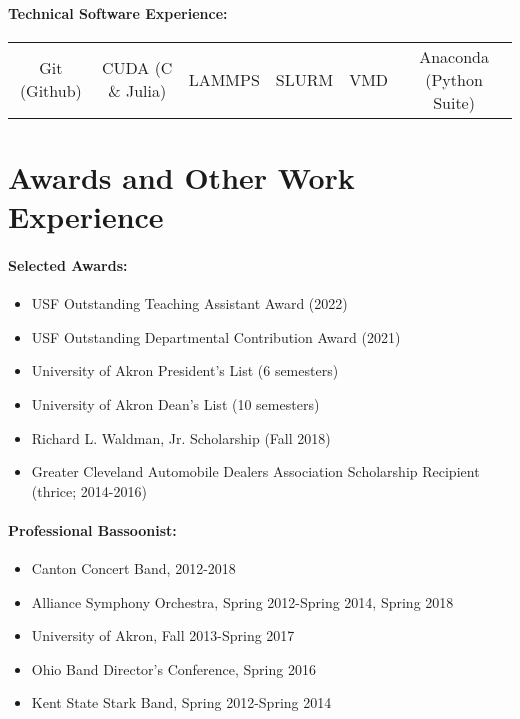 \documentclass{my_cv}
\begin{document}
\paragraph{Technical Software Experience:}
\begin{center}
\begin{tabular}{c|c|c|c|c|c}
   Git (Github) & CUDA (C \& Julia) & LAMMPS & SLURM & VMD & Anaconda (Python Suite) \\
\end{tabular}
\end{center}

\section{Awards and Other Work Experience}

\paragraph{Selected Awards:}
\begin{itemize}
    \item USF Outstanding Teaching Assistant Award (2022)
    \item USF Outstanding Departmental Contribution Award (2021)
    \item University of Akron President's List (6 semesters)
    \item University of Akron Dean's List (10 semesters)
    \item Richard L. Waldman, Jr. Scholarship (Fall 2018)
    \item Greater Cleveland Automobile Dealers Association Scholarship Recipient (thrice; 2014-2016)
\end{itemize}

\paragraph{Professional Bassoonist:}
\begin{itemize}
	\item Canton Concert Band, 2012-2018
	\item Alliance Symphony Orchestra, Spring 2012-Spring 2014, Spring 2018
    \item University of Akron, Fall 2013-Spring 2017
	\item Ohio Band Director’s Conference, Spring 2016
	\item Kent State Stark Band, Spring 2012-Spring 2014
\end{itemize}
\end{document}
